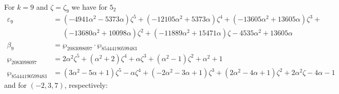 \documentclass[12pt]{amsart}
\theoremstyle{definition}
\def\a{\alpha}
\def\z{\zeta}
\def\z{\zeta}
\begin{document}

\noindent 
For $k=9$ and $\zeta=\zeta_9$ we have for $5_2$
{\small
\begin{align*}
\varepsilon_{9} &= 
(-4941 \a^2 - 5373 \a) \z^5 + (-12105 \a^2 + 5373 \a) \z^4 + (-13605 \a^2 + 13605 \a) \z^3 + 
\\ & \quad\,\,
(-13680 \a^2 + 10098 \a) \z^2 + (-11889 \a^2 + 15471 \a) \z - 4535 \a^2 + 13605 \a
\\
\beta_{9} &= \wp_{2083098097} \cdot \wp_{85444190599483} \\
\wp_{2083098097} &=
2 \a^2 \z^5 + (\a^2 + 2) \z^4 + \a \z^3 + (\a^2 - 1) \z^2 + \a^2 + 1
\\
\wp_{85444190599483} &=
(3 \a^2 - 5 \a + 1) \z^5 - \a \z^4 + (-2 \a^2 - 3 \a + 1) \z^3 + (2 \a^2 - 4 \a + 1) \z^2 + 2 \a^2 \z - 4 \a - 1
\end{align*}
}
and for $(-2,3,7)$, respectively:
\end{document}
